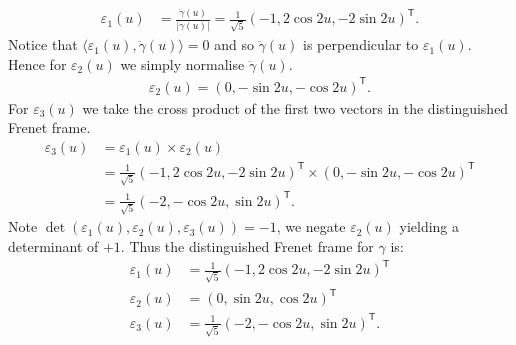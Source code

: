 \documentclass[a4paper]{article}
\newcommand{\ip}[2]{\langle #1, #2 \rangle}
\newcommand{\ds}{\displaystyle}
\begin{document}
\begin{enumerate}[leftmargin=*]
\begin{align*}
		\varepsilon_1(u) & = \frac{\dot{\gamma}(u)}{|\dot{\gamma}(u)|} = \frac{1}{\sqrt{5}}(-1, 2\cos{2u}, -2\sin{2u})^\mathsf{T}.
	\end{align*}
	Notice that $\ds{\ip{\varepsilon_1(u)}{\ddot{\gamma}(u)} = 0}$ and so $\ds{\ddot{\gamma}(u)}$ is perpendicular to $\ds{\varepsilon_1(u)}$. Hence for $\ds{\varepsilon_2(u)}$ we simply normalise $\ds{\ddot{\gamma}(u)}$.
	\begin{align*}
	\varepsilon_2(u) = (0, -\sin{2u}, -\cos{2u})^{\mathsf{T}}.
	\end{align*}
	For $\ds{\varepsilon_3(u)}$ we take the cross product of the first two vectors in the distinguished Frenet frame.
	\begin{align*}
		\varepsilon_3(u) & = \varepsilon_1(u) \times \varepsilon_2(u) \\
						 & = \frac{1}{\sqrt{5}}(-1, 2\cos{2u}, -2\sin{2u})^\mathsf{T} \times (0, -\sin{2u}, -\cos{2u})^{\mathsf{T}} \\
						 & = \frac{1}{\sqrt{5}}(-2, -\cos{2u}, \sin{2u})^\mathsf{T}.
	\end{align*}
	Note $\det(\varepsilon_1(u), \varepsilon_2(u), \varepsilon_3(u)) = -1$, we negate $\varepsilon_2(u)$ yielding a determinant of $+1$. Thus the distinguished Frenet frame for $\gamma$ is:
	\begin{align*}
		\varepsilon_1(u) & = \frac{1}{\sqrt{5}}(-1, 2\cos{2u}, -2\sin{2u})^\mathsf{T} \\
		\varepsilon_2(u) & = (0, \sin{2u}, \cos{2u})^{\mathsf{T}} \\
		\varepsilon_3(u) &  = \frac{1}{\sqrt{5}}(-2, -\cos{2u}, \sin{2u})^\mathsf{T}.
	\end{align*}

	\pagebreak


\end{enumerate}
\end{document}
